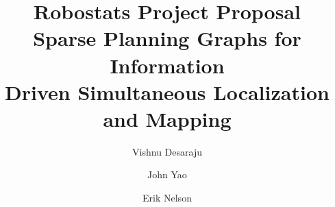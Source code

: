 \documentclass[]{article}
\begin{document}
\title{Robostats Project Proposal \\ Sparse Planning Graphs for Information \\ Driven Simultaneous Localization and Mapping}
\author{Vishnu Desaraju}
\author{John Yao}
\author{Erik Nelson}

\maketitle








\end{document}

